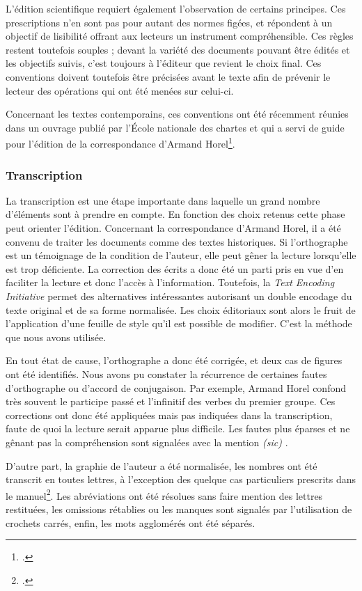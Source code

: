 \documentclass[12pt,a4paper]{book} %
\begin{document}
L'édition scientifique requiert également l'observation de certains principes. Ces prescriptions n'en sont pas pour autant des normes figées, et répondent à un objectif de lisibilité offrant aux lecteurs un instrument compréhensible. Ces règles restent toutefois souples ; devant la variété des documents pouvant être édités et les objectifs suivis, c'est toujours à l'éditeur que revient le choix final. Ces conventions doivent toutefois être précisées avant le texte afin de prévenir le lecteur des opérations qui ont été menées sur celui-ci.

Concernant les textes contemporains, ces conventions ont été récemment réunies dans un ouvrage publié par l'École nationale des chartes et qui a servi de guide pour l'édition de la correspondance d'Armand Horel\footcite{nougaret_ledition_2015}.

\subsubsection{Transcription}
La transcription est une étape importante dans laquelle un grand nombre d'éléments sont à prendre en compte. En fonction des choix retenus cette phase peut orienter l'édition. Concernant la correspondance d'Armand Horel, il a été convenu de traiter les documents comme des textes historiques. Si l'orthographe est un témoignage de la condition de l'auteur, elle peut gêner la lecture lorsqu'elle est trop déficiente. La correction des écrits a donc été un parti pris en vue d'en faciliter la lecture et donc l'accès à l'information. Toutefois, la \textit{Text Encoding Initiative} permet des alternatives intéressantes autorisant un double encodage du texte original et de sa forme normalisée. Les choix éditoriaux sont alors le fruit de l'application d'une feuille de style qu'il est possible de modifier. C'est la méthode que nous avons utilisée.


En tout état de cause, l'orthographe a donc été corrigée, et deux cas de figures ont été identifiés. 
Nous avons pu constater la récurrence  de certaines fautes d'orthographe ou d'accord de conjugaison. Par exemple, Armand Horel confond très souvent le participe passé et l'infinitif des verbes du premier groupe. Ces corrections ont donc été appliquées mais  pas indiquées dans la transcription, faute de quoi la lecture serait apparue plus difficile. Les fautes plus éparses et ne gênant pas la compréhension sont signalées avec la mention \og \textit{(sic)} \fg{}. 

D'autre part, la graphie de l'auteur a été normalisée, les nombres ont été transcrit en toutes lettres, à l'exception des quelque cas particuliers prescrits dans le manuel\footcite[p. 63]{nougaret_ledition_2015}. Les abréviations ont été résolues sans faire  mention des lettres restituées, les omissions rétablies ou les manques sont signalés par l'utilisation de crochets carrés, enfin, les mots agglomérés ont été séparés. 
\end{document}
